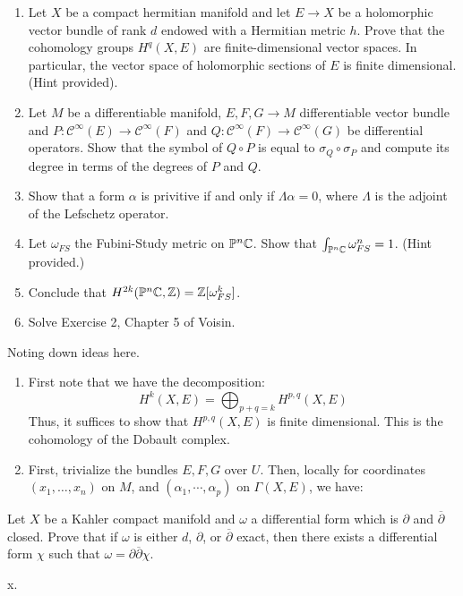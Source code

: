 \documentclass[12pt]{article}
\begin{document}


\begin{problem}{1}
    \begin{enumerate}
        \item Let $X$ be a compact hermitian manifold and let $E \to X$ be a holomorphic vector bundle of rank $d$ endowed with a Hermitian metric $h$. Prove that the cohomology groups $H^q(X, E)$ are finite-dimensional vector spaces. In particular, the vector space of holomorphic sections of $E$ is finite dimensional. (Hint provided).
        \item Let $M$ be a differentiable manifold, $E, F, G \to M$ differentiable vector bundle and $P: \mathcal{C}^\infty(E) \to \mathcal{C}^\infty(F)$ and $Q: \mathcal{C}^\infty(F) \to \mathcal{C}^\infty(G)$ be differential operators. Show that the symbol of $Q \circ P$ is equal to $\sigma_Q \circ \sigma_P$ and compute its degree in terms of the degrees of $P$ and $Q$.
        \item Show that a form $\alpha$ is privitive if and only if $\Lambda \alpha = 0$, where $\Lambda$ is the adjoint of the Lefschetz operator.
        \item Let $\omega_{FS}$ the Fubini-Study metric on $\mathbb{P}^n\mathbb C$. Show that $\int_{\mathbb{P}^n\mathbb C} \omega_{FS}^n = 1$. (Hint provided.)
        \item Conclude that $H^{2k}(\mathbb{P}^n\mathbb C, \mathbb Z) = \mathbb Z[\omega_{FS}^k]$. 
        \item Solve Exercise 2, Chapter 5 of Voisin. 
    \end{enumerate}
\end{problem}

\begin{solution}
    Noting down ideas here. 
    \begin{enumerate}
        \item First note that we have the decomposition:
        \[ H^k(X, E) = \bigoplus_{p+q=k} H^{p, q}(X, E)\]
        Thus, it suffices to show that $H^{p, q}(X, E)$ is finite dimensional. This is the cohomology of the Dobault complex. 
        \item First, trivialize the bundles $E, F, G$ over $U$. Then, locally for coordinates $(x_1, \ldots, x_n)$ on $M$, and $(\alpha_1, \cdots, \alpha_p)$ on $\Gamma(X, E)$, we have: 
        
    \end{enumerate}
\end{solution}
\newpage

\begin{problem}{2}
    Let $X$ be a Kahler compact manifold and $\omega$ a differential form which is $\partial$ and $\overline{\partial}$ closed. Prove that if $\omega$ is either $d$, $\partial$, or $\overline{\partial}$ exact, then there exists a differential form $\chi$ such that $\omega = \partial \overline{\partial} \chi$.
\end{problem}

\begin{solution}
    
\end{solution}
\newpage

\begin{problem}{x.}
\end{problem}

\begin{solution}

\end{solution}
\end{document}
